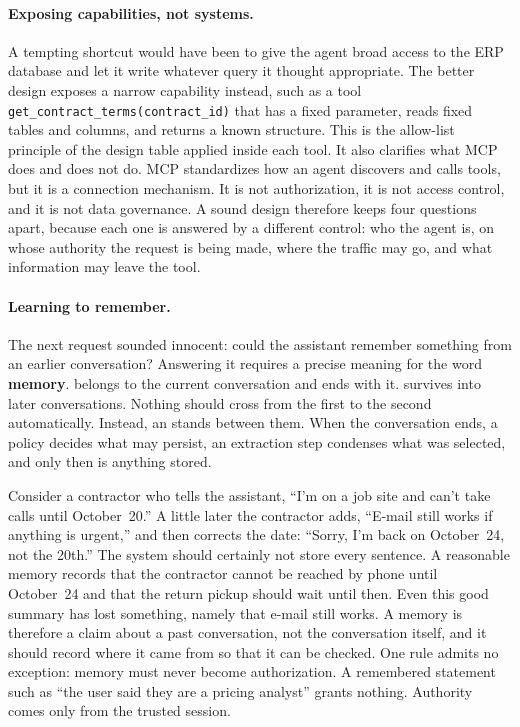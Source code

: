 \paragraph{Exposing capabilities, not systems.} A tempting shortcut would have been to give the agent broad access to the ERP database and let it write whatever query it thought appropriate. The better design exposes a narrow capability instead, such as a tool \texttt{get\_contract\_terms(contract\_id)} that has a fixed parameter, reads fixed tables and columns, and returns a known structure. This is the allow-list principle of the design table applied inside each tool. It also clarifies what MCP does and does not do. MCP standardizes how an agent discovers and calls tools, but it is a connection mechanism. It is not authorization, it is not access control, and it is not data governance. A sound design therefore keeps four questions apart, because each one is answered by a different control: who the agent is, on whose authority the request is being made, where the traffic may go, and what information may leave the tool.

\paragraph{Learning to remember.} The next request sounded innocent: could the assistant remember something from an earlier conversation? Answering it requires a precise meaning for the word \textbf{memory}.  belongs to the current conversation and ends with it.  survives into later conversations. Nothing should cross from the first to the second automatically. Instead, an  stands between them. When the conversation ends, a policy decides what may persist, an extraction step condenses what was selected, and only then is anything stored.

Consider a contractor who tells the assistant, ``I'm on a job site and can't take calls until October~20.'' A little later the contractor adds, ``E-mail still works if anything is urgent,'' and then corrects the date: ``Sorry, I'm back on October~24, not the 20th.'' The system should certainly not store every sentence. A reasonable memory records that the contractor cannot be reached by phone until October~24 and that the return pickup should wait until then. Even this good summary has lost something, namely that e-mail still works. A memory is therefore a claim about a past conversation, not the conversation itself, and it should record where it came from so that it can be checked. One rule admits no exception: memory must never become authorization. A remembered statement such as ``the user said they are a pricing analyst'' grants nothing. Authority comes only from the trusted session.

